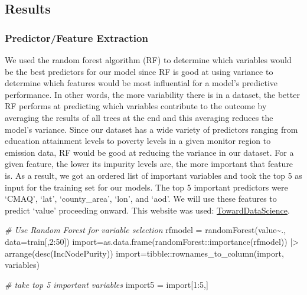 \documentclass[
]{article}
\newenvironment{Shaded}{\begin{snugshade}}{\end{snugshade}}
\newcommand{\AttributeTok}[1]{\textcolor[rgb]{0.77,0.63,0.00}{#1}}
\newcommand{\CommentTok}[1]{\textcolor[rgb]{0.56,0.35,0.01}{\textit{#1}}}
\newcommand{\DecValTok}[1]{\textcolor[rgb]{0.00,0.00,0.81}{#1}}
\newcommand{\FunctionTok}[1]{\textcolor[rgb]{0.00,0.00,0.00}{#1}}
\newcommand{\NormalTok}[1]{#1}
\newcommand{\OtherTok}[1]{\textcolor[rgb]{0.56,0.35,0.01}{#1}}
\newcommand{\SpecialCharTok}[1]{\textcolor[rgb]{0.00,0.00,0.00}{#1}}
\newcommand{\StringTok}[1]{\textcolor[rgb]{0.31,0.60,0.02}{#1}}
\begin{document}
\hypertarget{results}{%
\subsection{Results}\label{results}}

\hypertarget{predictorfeature-extraction}{%
\subsubsection{Predictor/Feature
Extraction}\label{predictorfeature-extraction}}

We used the random forest algorithm (RF) to determine which variables
would be the best predictors for our model since RF is good at using
variance to determine which features would be most influential for a
model's predictive performance. In other words, the more variability
there is in a dataset, the better RF performs at predicting which
variables contribute to the outcome by averaging the results of all
trees at the end and this averaging reduces the model's variance. Since
our dataset has a wide variety of predictors ranging from education
attainment levels to poverty levels in a given monitor region to
emission data, RF would be good at reducing the variance in our dataset.
For a given feature, the lower its impurity levels are, the more
important that feature is. As a result, we got an ordered list of
important variables and took the top 5 as input for the training set for
our models. The top 5 important predictors were `CMAQ', `lat',
`county\_area', `lon', and `aod'. We will use these features to predict
`value' proceeding onward. This website was used:
\href{https://towardsdatascience.com/feature-selection-using-random-forest-26d7b747597f}{TowardDataScience}.

\begin{Shaded}
\begin{Highlighting}[]
\CommentTok{\# Use Random Forest for variable selection}
\NormalTok{rfmodel }\OtherTok{=} \FunctionTok{randomForest}\NormalTok{(value}\SpecialCharTok{\textasciitilde{}}\NormalTok{., }\AttributeTok{data=}\NormalTok{train[,}\DecValTok{2}\SpecialCharTok{:}\DecValTok{50}\NormalTok{])}
\NormalTok{import}\OtherTok{=}\FunctionTok{as.data.frame}\NormalTok{(randomForest}\SpecialCharTok{::}\FunctionTok{importance}\NormalTok{(rfmodel)) }\SpecialCharTok{|\textgreater{}} \FunctionTok{arrange}\NormalTok{(}\FunctionTok{desc}\NormalTok{(IncNodePurity))}
\NormalTok{import}\OtherTok{=}\NormalTok{tibble}\SpecialCharTok{::}\FunctionTok{rownames\_to\_column}\NormalTok{(import, }\StringTok{\textquotesingle{}variables\textquotesingle{}}\NormalTok{)}

\CommentTok{\# take top 5 important variables}
\NormalTok{import5 }\OtherTok{=}\NormalTok{ import[}\DecValTok{1}\SpecialCharTok{:}\DecValTok{5}\NormalTok{,]}
\end{Highlighting}
\end{Shaded}
\end{document}
